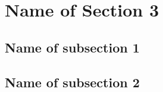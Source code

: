 \section{Name of Section 3}

\subsection{Name of subsection 1}



\subsection{Name of subsection 2}

